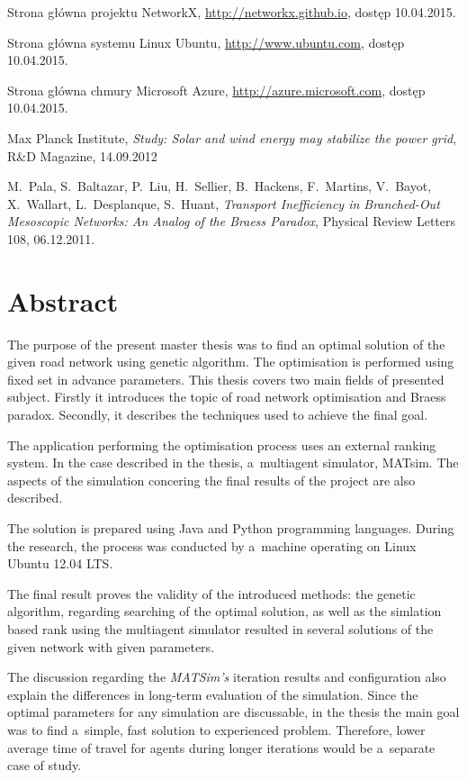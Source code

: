 \documentclass[twoside,12pt]{report}
\let\oldsection\chapter
\def\chapter{\cleardoublepage\oldsection}
\begin{document}
\begin{thebibliography}{99}
	Strona główna projektu NetworkX,
	\url{http://networkx.github.io},
	dostęp 10.04.2015.
	
	Strona główna systemu Linux Ubuntu,
	\url{http://www.ubuntu.com},
	dostęp 10.04.2015.
	
	Strona główna chmury Microsoft Azure,
	\url{http://azure.microsoft.com},
	dostęp 10.04.2015.
		
	Max Planck Institute, 
	\textit{Study: Solar and wind energy may stabilize the power grid},
	R\&D Magazine, 14.09.2012	

	M.~Pala, S.~Baltazar, P.~Liu, H.~Sellier, B.~Hackens, F.~Martins, V.~Bayot, X.~Wallart, L.~Desplanque, S.~Huant,
	\textit{Transport Inefficiency in Branched-Out Mesoscopic Networks: An Analog of the Braess Paradox},
	Physical Review Letters 108, 06.12.2011.

\end{thebibliography}

\clearpage
{}
{}
\chapter*{Abstract}

The purpose of the present master thesis was to find an optimal solution of the given road network using genetic algorithm. The optimisation is performed using fixed set in advance parameters. This thesis covers two main fields of presented subject. Firstly it introduces the topic of road network optimisation and Braess paradox. Secondly, it describes the techniques used to achieve the final goal.

The application performing the optimisation process uses an external ranking system. In the case described in the thesis, a~multiagent simulator, MATsim. The aspects of the simulation concering the final results of the project are also described. 

The solution is prepared using Java and Python programming languages. During the research, the process was conducted by a~machine operating on Linux Ubuntu 12.04 LTS.

The final result proves the validity of the introduced methods: the genetic algorithm, regarding searching of the optimal solution, as well as the simlation based rank using the multiagent  simulator resulted in several solutions of the given network with given parameters.

The discussion regarding the \textit{MATSim's} iteration results and configuration also explain the differences in long-term evaluation of the simulation. Since the optimal parameters for any simulation are discussable, in the thesis the main goal was to find a~simple, fast solution to experienced problem. Therefore, lower average time of travel for agents during longer iterations would be a~separate case of study.

\clearpage
\thispagestyle{empty}
\mbox{}


\clearpage

\end{document}
